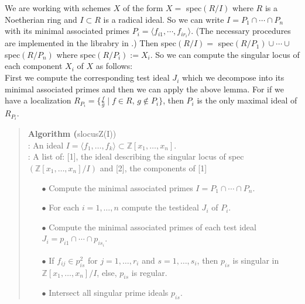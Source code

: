 \documentclass{article}
\newenvironment{algo}[1]{\begin{quote}{\bf Algorithm #1}}{\end{quote}}
\begin{document}
\noindent
We are working with schemes $X$ of the form $X =$ spec$(R/I)$ where $R$ is a 
Noetherian ring and $I \subset R$ is a radical ideal. 
So we can write $I = P_1 \cap\cdots\cap P_n$ with its minimal associated 
primes $P_i=\langle f_{i1},\cdots,f_{ir_i} \rangle$. (The necessary procedures
are implemented in the librabry {} in {}.)
Then spec$(R/I)=$ spec$(R/P_1)\cup\cdots\cup$ spec$(R/P_n)$ 
where spec$(R/P_i):= X_i$. 
So we can compute the singular locus of each component $X_i$ of $X$ as follows:\\ 
First we compute the corresponding test ideal $J_i$ which we decompose into its 
minimal associated primes and then we can apply the above lemma. 
For if we have a localization $R_{P_i}=\{ \frac{f}{g}\mid f\in R,\, g\not\in P_i\}$, 
then $P_i$ is the only maximal ideal of $R_{P_i}$.\\

\begin{algo}(slocusZ(I))\\

{}: An ideal $I=\langle f_1,\ldots,f_k\rangle \subset
\mathbb{Z}[x_1,\ldots,x_n]$.\\
{}: A list of: [1], the ideal describing the singular locus of
spec$(\mathbb{Z}[x_1,\ldots,x_n] / I)$ and [2], the components of [1]
 
\begin{enumerate}
\item[$\bullet$] Compute the minimal associated primes $I = P_1 \cap\cdots\cap P_n$.
\item[$\bullet$] For each $i=1,\ldots,n$ compute the testideal $J_i$ of $P_i$.
\item[$\bullet$] Compute the minimal associated primes of each test ideal
$J_i = p_{i1} \cap\cdots\cap p_{is_i}$.
\item[$\bullet$] If $f_{ij} \in p_{is}^2$ for $j=1,\ldots,r_i$ and 
$s=1,\ldots,s_i$, then $p_{is}$ is singular in $\mathbb{Z}[x_1,\ldots,x_n]/I$, 
else, $p_{is}$ is regular.
\item[$\bullet$] Intersect all singular prime ideals $p_{is}$.
\end{enumerate} 
\end{algo}
 
\end{document}
